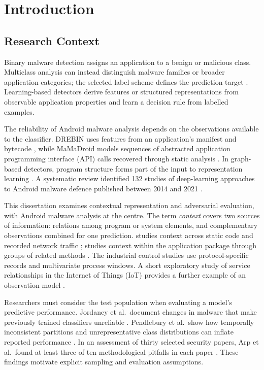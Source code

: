 \chapter{Introduction}
\label{chap:introduction}

\section{Research Context}
\label{sec:intro:context}

Binary malware detection assigns an application to a benign or malicious class. Multiclass
analysis can instead distinguish malware families or broader application categories; the
selected label scheme defines the prediction target \cite{bilot2024survey}. Learning-based
detectors derive features or structured representations from observable application properties
and learn a decision rule from labelled examples.

The reliability of Android malware analysis depends on the observations available to the
classifier. DREBIN uses features from an application's manifest and bytecode
\cite{arp2014drebin}, while MaMaDroid models sequences of abstracted application programming
interface (API) calls recovered through static analysis \cite{onwuzurike2019mamadroid}.
In graph-based detectors, program structure forms part of the input to representation
learning \cite{bilot2024survey}. A systematic review identified 132 studies of deep-learning
approaches to Android malware defence published between 2014 and 2021
\cite{liu2023deeplearning}.

This dissertation examines contextual representation and adversarial evaluation, with Android
malware analysis at the centre. The term \emph{context} covers two sources of information:
relations among program or system elements, and complementary observations combined for one
prediction. \hybroid{} studies
context across static code and recorded network traffic \cite{norouzian2021hybroid}; \hgann{}
studies context within the application package through groups of related methods
\cite{norouzian2025hgannmal}. The industrial control studies use
protocol-specific records and multivariate process windows. A short exploratory study of
service relationships in the Internet of Things (IoT) provides a further example of an
observation model \cite{aubet2018graph}.

Researchers must consider the test population when evaluating a model's predictive performance.
Jordaney et al.\ document changes in malware that make previously trained classifiers
unreliable \cite{jordaney2017transcend}. Pendlebury et al.\ show how temporally inconsistent
partitions and unrepresentative class distributions can inflate reported performance
\cite{pendlebury2019tesseract}. In an assessment of thirty selected security papers,
Arp et al.\ found at least three of ten methodological pitfalls in each paper
\cite{arp2022dos}. These findings motivate explicit sampling and evaluation assumptions.

